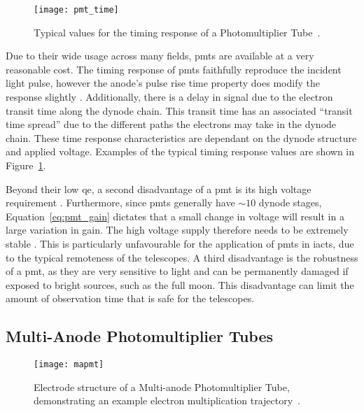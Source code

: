\begin{figure}
	\centering
    \texttt{[image: pmt\_time]} 
	\caption[Photomultiplier Tube timing characteristics.]{Typical values for the timing response of a Photomultiplier Tube~\cite{Hamamatsu2016}.}
	\label{fig:pmt_time}
\end{figure}

Due to their wide usage across many fields, \glspl{pmt} are available at a very reasonable cost. The timing response of \glspl{pmt} faithfully reproduce the incident light pulse, however the anode's pulse rise time property does modify the response slightly \cite{Hamamatsu2016}. Additionally, there is a delay in signal due to the electron transit time along the dynode chain. This transit time has an associated ``transit time spread'' due to the different paths the electrons may take in the dynode chain. These time response characteristics are dependant on the dynode structure and applied voltage. Examples of the typical timing response values are shown in Figure~\ref{fig:pmt_time}.

Beyond their low \gls{qe}, a second disadvantage of a \gls{pmt} is its high voltage requirement \cite{Weekes2003}. Furthermore, since \glspl{pmt} generally have $\sim 10$ dynode stages, Equation~\ref{eq:pmt_gain} dictates that a small change in voltage will result in a large variation in gain. The high voltage supply therefore needs to be extremely stable \cite{Hamamatsu2016}. This is particularly unfavourable for the application of \glspl{pmt} in \glspl{iact}, due to the typical remoteness of the telescopes. A third disadvantage is the robustness of a \gls{pmt}, as they are very sensitive to light and can be permanently damaged if exposed to bright sources, such as the full moon. This disadvantage can limit the amount of observation time that is safe for the telescopes.

\subsection{Multi-Anode Photomultiplier Tubes}

\begin{figure}
	\centering
    \texttt{[image: mapmt]} 
	\caption[Internals of a Multi-anode Photomultiplier Tube.]{Electrode structure of a Multi-anode Photomultiplier Tube, demonstrating an example electron multiplication trajectory~\cite{HAMAMATSU2007}.}
	\label{fig:mapmt}
\end{figure}

